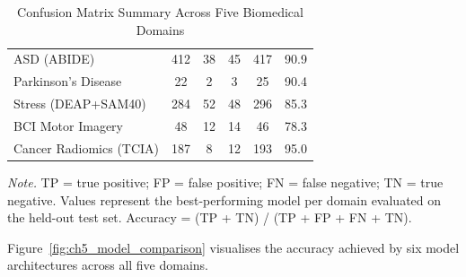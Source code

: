 \begin{table}[H]
\tablestripes
\begin{tabularx}{\textwidth}{L C C C C C}
\toprule
{} &  &  &  &  &  \\
\midrule
ASD (ABIDE) & 412 & 38 & 45 & 417 & 90.9 \\
\addlinespace
Parkinson's Disease & 22 & 2 & 3 & 25 & 90.4 \\
\addlinespace
Stress (DEAP+SAM40) & 284 & 52 & 48 & 296 & 85.3 \\
\addlinespace
BCI Motor Imagery & 48 & 12 & 14 & 46 & 78.3 \\
\addlinespace
Cancer Radiomics (TCIA) & 187 & 8 & 12 & 193 & 95.0 \\
\bottomrule
\end{tabularx}
\caption{Confusion Matrix Summary Across Five Biomedical Domains}
\label{tab:confusion_matrix_summary}
\vspace{0.5em}\noindent\textit{Note.} TP = true positive; FP = false positive; FN = false negative; TN = true negative. Values represent the best-performing model per domain evaluated on the held-out test set. Accuracy = (TP + TN) / (TP + FP + FN + TN).
\end{table}

Figure~\ref{fig:ch5_model_comparison} visualises the accuracy achieved by six model architectures across all five domains.

